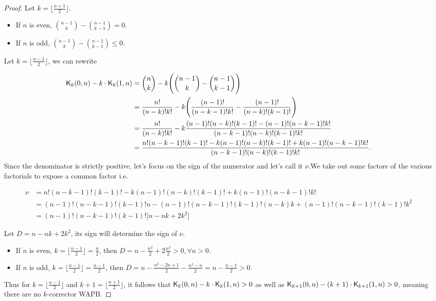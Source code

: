 \begin{proof}
    Let $k = \big\lfloor\frac{n + 1}{2}\big\rfloor$.
    \begin{itemize}
        \item If $n$ is even, $\binom{n - 1}{k} - \binom{n - 1}{k - 1} = 0$.
        \item If $n$ is odd, $\binom{n - 1}{k} - \binom{n - 1}{k - 1} \leq 0$.
    \end{itemize}

    Let $k = \big\lfloor \frac{n - 1}{2}\big\rfloor$, we can rewrite

    \begin{equation*}
        \begin{split}
            \mathsf{K}_{k}(0,n) - k \cdot \mathsf{K}_{k}(1,n) &= \binom{n}{k} - k\Bigg(\binom{n - 1}{k} - \binom{n - 1}{k - 1}\Bigg)\\
            & = \frac{n!}{(n - k)!k!} - k \Bigg(\frac{(n - 1)!}{(n - k - 1)!k!} - \frac{(n - 1)!}{(n - k)!(k - 1)!}\Bigg)\\
            & = \frac{n!}{(n - k)!k!} - k \frac{(n-1)!(n-k)!(k-1)! - (n-1)!(n-k-1)!k!}{(n-k-1)!(n-k)!(k-1)!k!}\\
            & = \frac{n!(n-k-1)!(k-1)! - k(n - 1)!(n - k)!(k - 1)! + k(n - 1)!(n - k - 1)!k!}{(n-k-1)!(n-k)!(k-1)!k!}.
        \end{split}
    \end{equation*}
    Since the denominator is strictly positive, let's focus on the sign of the numerator and let's call it $\nu$.We take out some factors of the various factorials to expose a common factor i.e.

    \begin{equation*}
        \begin{split}
            \nu &= n!(n-k-1)!(k-1)! - k(n - 1)!(n - k)!(k - 1)! + k(n - 1)!(n - k - 1)!k!\\
            & = (n-1)!(n-k-1)!(k-1)!n - (n - 1)!(n - k - 1)!(k - 1)!(n - k)k + (n - 1)!(n - k - 1)!(k-1)!k^2\\
            & = (n - 1)!(n - k - 1)!(k - 1)!\big[n - nk + 2k^2\big]
        \end{split}
    \end{equation*}

    Let $D = n - nk + 2k^2$, its sign will determine the sign of $\nu$.
    \begin{itemize}
        \item If $n$ is even, $k = \big\lfloor \frac{n - 1}{2}\big\rfloor = \frac{n}{2}$, then $D = n - \frac{n^2}{2} + 2\frac{n^2}{2} > 0, \forall n > 0$.
        \item If $n$ is odd, $k = \big\lfloor \frac{n - 1}{2}\big\rfloor = \frac{n - 1}{2}$, then $D = n - \frac{n^2 - 2n + 1}{2} - \frac{n^2 - n}{2} = n - \frac{n - 1}{2} > 0$.
    \end{itemize}

    Thus for $k = \big\lfloor \frac{n - 1}{2}\big\rfloor$ and $k+1 = \big\lfloor \frac{n + 1}{2}\big\rfloor$, it follows that $\mathsf{K}_{k}(0,n) - k\cdot \mathsf{K}_{k}(1,n) > 0$ as well as $\mathsf{K}_{k+1}(0,n) - (k+1)\cdot \mathsf{K}_{k+1}(1,n) > 0$, meaning there are no $k$-corrector WAPB.
\end{proof}

